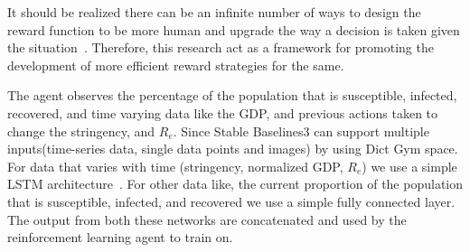 \documentclass[tikz,fleqn,12pt]{wlscirep}
\begin{document}
It should be realized there can be an infinite number of ways to design the reward function to be more human and upgrade the way a decision is taken given the situation~\cite{AWSDeepRacer}. Therefore, this research act as a  framework for promoting the development of more efficient reward strategies for the same. 

The agent observes the percentage of the population that is susceptible, infected, recovered, and time varying data like the GDP, and previous actions taken to change the stringency, and $R_e$. Since Stable Baselines3 can support multiple inputs(time-series data, single data points and images) by using Dict Gym space. For data that varies with time (stringency, normalized GDP, $R_e$) we use a simple LSTM architecture~\cite{LSTM}. For other data like, the current proportion of the population that is susceptible, infected, and recovered we use a simple fully connected layer. The output from both these networks are concatenated and used by the reinforcement learning agent to train on.
\end{document}
